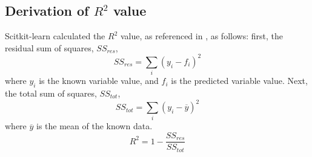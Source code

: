 \documentclass[journal,twoside,web]{ieeecolor}
\begin{document}
\subsection{Derivation of $R^2$ value}
Scitkit-learn calculated the $R^2$ value, as referenced in \cite{b7}, as follows:
first, the residual sum of squares, $SS_{res}$,
\begin{equation}
    \label{eq:ResidSumSquares}
    SS_{res} = \sum_{i}{(y_i-f_i)^2}
\end{equation}
where $y_i$ is the known variable value, and $f_i$ is the predicted variable value.
Next, the total sum of squares, $SS_{tot}$,
\begin{equation}
    \label{eq:TotSumSquares}
    SS_{tot} = \sum_{i}{(y_i-\overline{y})^2}
\end{equation}
where $\overline{y}$ is the mean of the known data.
\begin{equation}
    \label{eq:CoeffDeterm}
    R^2 = 1 - \frac{SS_{res}}{SS_{tot}}
\end{equation}
\end{document}
